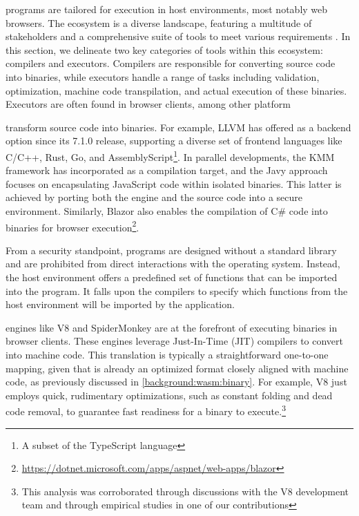\Wasm programs are tailored for execution in host environments, most notably web browsers. 
The \Wasm ecosystem is a diverse landscape, featuring a multitude of stakeholders and a comprehensive suite of tools to meet various requirements \cite{Avenger}. 
In this section, we delineate two key categories of tools within this ecosystem: compilers and executors. 
Compilers are responsible for converting source code into \Wasm binaries, while executors handle a range of tasks including validation, optimization, machine code transpilation, and actual execution of these \Wasm binaries. 
Executors are often found in browser clients, among other platform

 transform source code into \Wasm binaries. 
For example, LLVM has offered \Wasm as a backend option since its 7.1.0 release, supporting a diverse set of frontend languages like C/C++, Rust, Go, and AssemblyScript\footnote{A subset of the TypeScript language}.
In parallel developments, the KMM framework has incorporated \Wasm as a compilation target, and the Javy approach focuses on encapsulating JavaScript code within isolated \Wasm binaries. 
This latter is achieved by porting both the engine and the source code into a secure \Wasm environment. 
Similarly, Blazor also enables the compilation of C# code into \Wasm binaries for browser execution\footnote{\url{https://dotnet.microsoft.com/apps/aspnet/web-apps/blazor}}.

From a security standpoint, \Wasm programs are designed without a standard library and are prohibited from direct interactions with the operating system. Instead, the host environment offers a predefined set of functions that can be imported into the \Wasm program. 
It falls upon the compilers to specify which functions from the host environment will be imported by the \Wasm application.

 engines like V8 and SpiderMonkey are at the forefront of executing \Wasm binaries in browser clients. 
These engines leverage Just-In-Time (JIT) compilers to convert \Wasm into machine code. 
This translation is typically a straightforward one-to-one mapping, given that \Wasm is already an optimized format closely aligned with machine code, as previously discussed in \autoref{background:wasm:binary}. 
For example, V8 just employs quick, rudimentary optimizations, such as constant folding and dead code removal, to guarantee fast readiness for a \wasm binary to execute.\footnote{This analysis was corroborated through discussions with the V8 development team and through empirical studies in one of our contributions\cite{CROW}} 

